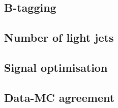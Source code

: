 \subsection{B-tagging}

\subsection{Number of light jets}

\subsection{Signal optimisation}

\subsection{Data-MC agreement}